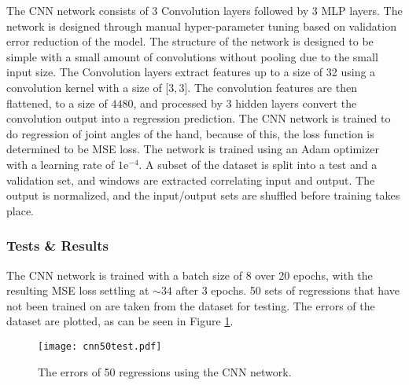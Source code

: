 \documentclass[../main.tex]{subfiles}
\begin{document}
The CNN network consists of 3 Convolution layers followed by 3 MLP layers.
The network is designed through manual hyper-parameter tuning based on validation error reduction of the model.
The structure of the network is designed to be simple with a small amount of convolutions without pooling due to the small input size.
The Convolution layers extract features up to a size of 32 using a convolution kernel with a size of [$3, 3$].
The convolution features are then flattened, to a size of $4480$, and processed by 3 hidden layers convert the convolution output into a regression prediction.
The CNN network is trained to do regression of joint angles of the hand, because of this, the loss function is determined to be MSE loss.
The network is trained using an Adam optimizer with a learning rate of $1\text{e}^{-4}$.
A subset of the dataset is split into a test and a validation set, and windows are extracted correlating input and output.
The output is normalized, and the input/output sets are shuffled before training takes place.


\subsubsection{Tests \& Results}


%
The CNN network is trained with a batch size of 8 over 20 epochs, with the resulting MSE loss settling at $\sim 34$ after 3 epochs.
50 sets of regressions that have not been trained on are taken from the dataset for testing.
The errors of the dataset are plotted, as can be seen in Figure \ref{fig:cnntest}.

\begin{figure}[H]
\begin{center}
\texttt{[image: cnn50test.pdf]}
\caption{The errors of 50 regressions using the CNN network.}
\label{fig:cnntest}
\end{center}
\end{figure}
\end{document}
